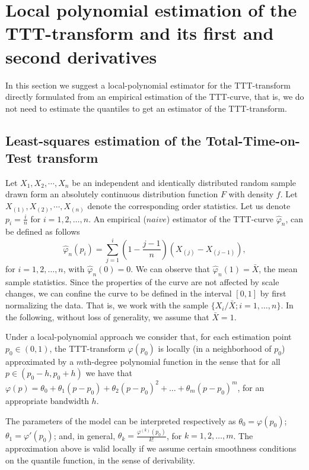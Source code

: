 \documentclass[preprint,12pt]{elsarticle}
\begin{document}
%
\section{Local polynomial estimation of the TTT-transform and its first and second derivatives}\label{locpol}
\noindent In this section we suggest a local-polynomial estimator for the TTT-transform directly formulated from an empirical estimation of the TTT-curve, that is, we do not need to estimate the quantiles to get an estimator of the TTT-transform.
%
\subsection{Least-squares estimation of the Total-Time-on-Test transform}
\noindent Let $X_1,X_2,\cdots,X_n$ be an independent and identically distributed random sample drawn form an absolutely continuous distribution function $F$ with density $f$. Let $X_{(1)},X_{(2)},\cdots,X_{(n)}$ denote the corresponding order statistics. Let us denote $p_i=\frac{i}{n}$ for $i= 1,2, \ldots, n$. An empirical ($naive$) estimator of the TTT-curve $\widehat{\varphi}_n$, can be defined as follows
%
\begin{equation}\label{empi}
\widehat{\varphi}_n\left(p_i\right)= \sum_{j=1}^i \left(1-\frac{j-1}{n}\right) \left(X_{(j)}-X_{(j-1)}\right),
\end{equation}
for $i=1,2,\ldots,n$, with $\widehat{\varphi}_n(0)=0$. We can observe that $\widehat{\varphi}_n(1)=\bar{X}$, the mean sample statistics. Since the properties of the curve are not affected by scale changes, we can confine the curve to be defined in the interval $[0,1]$ by first normalizing the data. That is, we work with the sample $\{X_i/\bar{X}; i=1,\ldots,n\}$. In the following, without loss of generality, we assume that $\bar{X}=1$.

Under a local-polynomial approach we consider that, for each estimation point $p_0 \in (0,1)$, the TTT-transform $\varphi(p_0)$ is locally (in a neighborhood of $p_0$) approximated by a $m$th-degree polynomial function in the sense that for all $p \in \left(p_0-h,p_0+h\right)$ we have that $\varphi(p)=\theta_0+\theta_1(p-p_0)+\theta_2(p-p_0)^2+\ldots+\theta_m(p-p_0)^m$, for an appropriate bandwidth $h$. 

The parameters of the model can be interpreted respectively as $\theta_0={\varphi}(p_0)$; ${\theta}_1={\varphi'}(p_0)$; and, in general, ${\theta}_k=\frac{\varphi^{(k)}(p_0)}{k!}$, for $k=1,2,\ldots,m$. The approximation above is valid locally if we assume certain smoothness conditions on the quantile function, in the sense of derivability. 
\end{document}
